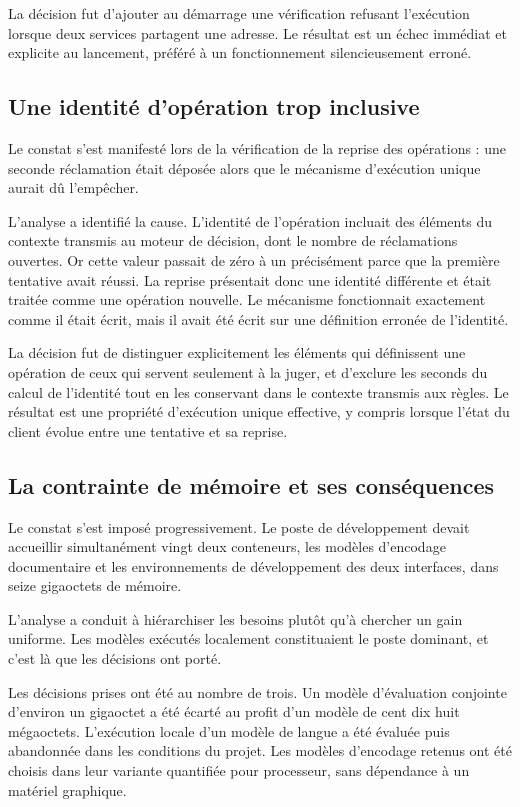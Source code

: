 La décision fut d'ajouter au démarrage une vérification refusant l'exécution lorsque deux services partagent une adresse. Le résultat est un échec immédiat et explicite au lancement, préféré à un fonctionnement silencieusement erroné.

\subsection{Une identité d'opération trop inclusive}

Le constat s'est manifesté lors de la vérification de la reprise des opérations : une seconde réclamation était déposée alors que le mécanisme d'exécution unique aurait dû l'empêcher.

L'analyse a identifié la cause. L'identité de l'opération incluait des éléments du contexte transmis au moteur de décision, dont le nombre de réclamations ouvertes. Or cette valeur passait de zéro à un précisément parce que la première tentative avait réussi. La reprise présentait donc une identité différente et était traitée comme une opération nouvelle. Le mécanisme fonctionnait exactement comme il était écrit, mais il avait été écrit sur une définition erronée de l'identité.

La décision fut de distinguer explicitement les éléments qui définissent une opération de ceux qui servent seulement à la juger, et d'exclure les seconds du calcul de l'identité tout en les conservant dans le contexte transmis aux règles. Le résultat est une propriété d'exécution unique effective, y compris lorsque l'état du client évolue entre une tentative et sa reprise.

\subsection{La contrainte de mémoire et ses conséquences}

Le constat s'est imposé progressivement. Le poste de développement devait accueillir simultanément vingt deux conteneurs, les modèles d'encodage documentaire et les environnements de développement des deux interfaces, dans seize gigaoctets de mémoire.

L'analyse a conduit à hiérarchiser les besoins plutôt qu'à chercher un gain uniforme. Les modèles exécutés localement constituaient le poste dominant, et c'est là que les décisions ont porté.

Les décisions prises ont été au nombre de trois. Un modèle d'évaluation conjointe d'environ un gigaoctet a été écarté au profit d'un modèle de cent dix huit mégaoctets. L'exécution locale d'un modèle de langue a été évaluée puis abandonnée dans les conditions du projet. Les modèles d'encodage retenus ont été choisis dans leur variante quantifiée pour processeur, sans dépendance à un matériel graphique.

